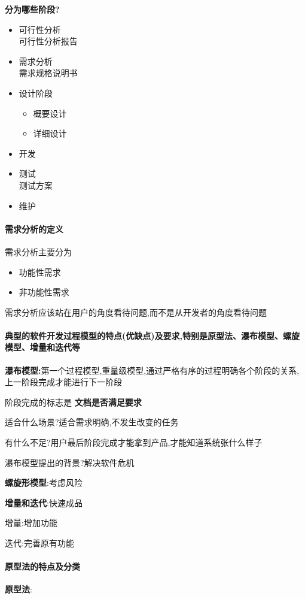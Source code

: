 \documentclass[UTF8,a4paper]{ctexart}
\begin{document}
\textbf{分为哪些阶段?}
\begin{itemize}
  \item 可行性分析\\
  可行性分析报告
  \item 需求分析\\
  需求规格说明书
  \item 设计阶段
  \begin{itemize}
    \item 概要设计
    \item 详细设计
  \end{itemize}
  \item 开发
  \item 测试\\
  测试方案
  \item 维护
\end{itemize}

\paragraph{需求分析的定义}

需求分析主要分为
\begin{itemize}
  \item 功能性需求
  \item 非功能性需求
\end{itemize}

需求分析应该站在用户的角度看待问题,而不是从开发者的角度看待问题

\paragraph{典型的软件开发过程模型的特点(优缺点)及要求,特别是原型法、瀑布模型、螺旋模型、增量和迭代等}

\textbf{瀑布模型:}第一个过程模型,重量级模型,通过严格有序的过程明确各个阶段的关系,上一阶段完成才能进行下一阶段

阶段完成的标志是 \textbf{文档是否满足要求}

适合什么场景?适合需求明确,不发生改变的任务

有什么不足?用户最后阶段完成才能拿到产品,才能知道系统张什么样子

瀑布模型提出的背景?解决软件危机

\textbf{螺旋形模型}:考虑风险

\textbf{增量和迭代}:快速成品

增量:增加功能

迭代:完善原有功能

\paragraph{原型法的特点及分类}
\textbf{原型法}:
\end{document}
